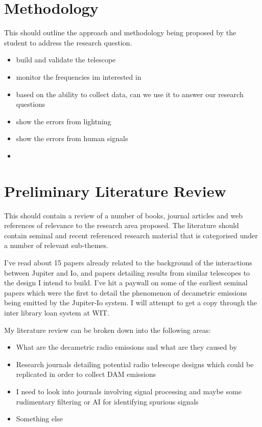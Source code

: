 \documentclass[runningheads,a4paper]{llncs}
\begin{document}
%
%
\newpage
\section*{Methodology}
This should outline the approach and methodology being proposed by the student to address the research question.

\begin{itemize}
  \item build and validate the telescope
  \item monitor the frequencies im interested in
  \item based on the ability to collect data, can we use it to answer our research questions
  \item show the errors from lightning
  \item show the errors from human signals
  \item 
\end{itemize}

%
%
\newpage
\section*{Preliminary Literature Review}
This should contain a review of a number of books, journal articles and web references of relevance to the research area proposed. The literature should contain seminal and recent referenced research material that is categorised under a number of relevant sub-themes.


I've read about 15 papers already related to the background of the interactions between Jupiter and Io, and papers detailing results from similar telescopes to the design I intend to build. I've hit a paywall on some of the earliest seminal papers which were the first to detail the phenomenon of decametric emissions being emitted by the Jupiter-Io system. I will attempt to get a copy through the inter library loan system at WIT.


My literature review can be broken down into the following areas:

\begin{itemize}
  \item What are the decametric radio emissions and what are they caused by
  \item Research journals detailing potential radio telescope designs which could be replicated in order to collect DAM emissions
  \item I need to look into journals involving signal processing and maybe some rudimentary filtering or AI for identifying spurious signals
  \item Something else
  
\end{itemize}
%
%
\newpage
\end{document}
